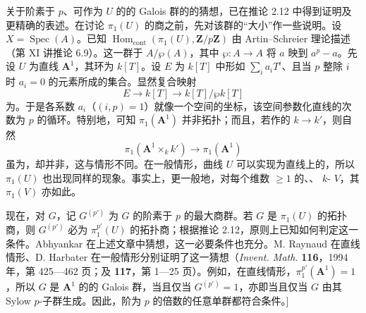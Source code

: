 关于阶素于 $p$、可作为 $U$ 的的 Galois 群的的猜想，已在推论 2.12 中得到证明及更精确的表述。在讨论 $\pi_1(U)$ 的商之前，先对该群的“大小”作一些说明。设 $X=\operatorname{Spec}(A)$。已知 $\operatorname{Hom}_{\mathrm{cont}}(\pi_1(U),\mathbf Z/p\mathbf Z)$ 由 Artin–Schreier 理论描述（第 XI 讲推论 6.9）。这一群于 $A/\wp(A)$，其中 $\wp:A\to A$ 将 $a$ 映到 $a^p-a$。先设 $U$ 为直线 $\mathbf A^1$，其环为 $k[T]$。设 $E$ 为 $k[T]$ 中形如 $\sum_i a_iT^i$、且当 $p$ 整除 $i$ 时 $a_i=0$ 的元素所成的集合。显然复合映射
\[E\longrightarrow k[T]\longrightarrow k[T]/\wp k[T]\]
为。于是各系数 $a_i$（$(i,p)=1$）就像一个空间的坐标，该空间参数化直线的次数为 $p$ 的循环。特别地，可知 $\pi_1(\mathbf A^1)$ 并非拓扑；而且，若作的 $k\to k'$，则自然
\[\pi_1(\mathbf A^1\times_k k')\longrightarrow\pi_1(\mathbf A^1)\]
虽为，却并非，这与情形不同。在一般情形，曲线 $U$ 可以实现为直线上的，所以 $\pi_1(U)$ 也出现同样的现象。事实上，更一般地，对每个维数 $\geqslant1$ 的、、 $k$- $V$，其 $\pi_1(V)$ 亦如此。

现在，对 $G$，记 $G^{(p')}$ 为 $G$ 的阶素于 $p$ 的最大商群。若 $G$ 是 $\pi_1(U)$ 的拓扑商，则 $G^{(p')}$ 必为 $\pi_1^{p'}(U)$ 的拓扑商；根据推论 2.12，原则上已知如何判定这一条件。Abhyankar 在上述文章中猜想，这一必要条件也充分。M. Raynaud 在直线情形、D. Harbater 在一般情形分别证明了这一猜想（\textit{Invent. Math.} \textbf{116}，1994 年，第 425—462 页；及 \textbf{117}，第 1—25 页）。例如，在直线情形，$\pi_1^{p'}(\mathbf A^1)=1$，所以 $G$ 是 $\mathbf A^1$ 的的 Galois 群，当且仅当
$G^{(p')}=1$，亦即当且仅当 $G$ 由其 Sylow $p$-子群生成。因此，阶为 $p$ 的倍数的任意单群都符合条件。]
